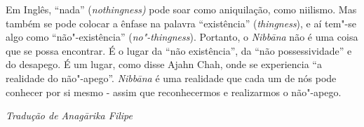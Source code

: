 Em Inglês, ``nada'' (\emph{nothingness)} pode soar como aniquilação,
como niilismo. Mas também se pode colocar a ênfase na palavra
``existência'' (\emph{thingness}), e aí tem"-se algo como
``não"-existência'' (\emph{no"-thingness}). Portanto, o \emph{Nibbāna} não
é uma coisa que se possa encontrar. É o lugar da ``não existência'', da
``não possessividade'' e do desapego. É um lugar, como disse Ajahn Chah,
onde se experiencia ``a realidade do não"-apego''. \emph{Nibbāna} é uma
realidade que cada um de nós pode conhecer por si mesmo - assim que
reconhecermos e realizarmos o não"-apego.


\bigskip

{\raggedleft\itshape
  Tradução de Anagārika Filipe
\par}
